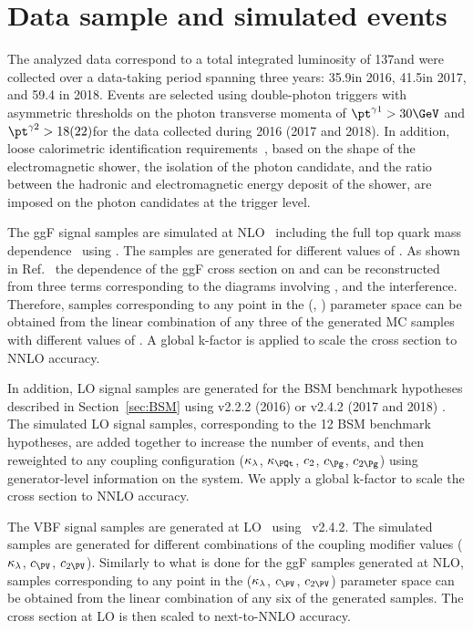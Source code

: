 \documentclass[11pt,twoside,a4paper,cmspaper,final,collab]{cms-tdr}
\begin{document}
\section{Data sample and simulated events} \label{sec:samples}
The analyzed data correspond to a total integrated luminosity of 137\fbinv and were collected over a data-taking period spanning three years: 35.9\fbinv in 2016, 41.5\fbinv in 2017, and \mbox{59.4\fbinv} in 2018.
Events are selected using double-photon triggers with asymmetric thresholds on the photon transverse momenta of $\ptgone > 30\GeV$ and $\ptgtwo > 18 (22)$\GeV for the data collected during 2016 (2017 and 2018). In addition, loose calorimetric identification requirements~\cite{Sirunyan:2018ouh}, based on the shape of the electromagnetic shower, the isolation of the photon candidate, and the ratio between the hadronic and electromagnetic energy deposit of the shower, are imposed on the photon candidates at the trigger level. 

The ggF \HH signal samples are simulated at NLO~\cite{Bagnaschi:2011tu,Heinrich:2017kxx,Heinrich:2019bkc,Jones:2017giv} including
the full top quark mass dependence~\cite{Buchalla:2018yce} using . 
The samples are generated for different values of \kapl. As shown in Ref.~\cite{Heinrich:2019bkc} the dependence of the ggF \HH cross section on \kapl and \kapt can be reconstructed from three terms corresponding to the diagrams involving \kapl, \kapt and the interference. Therefore, samples corresponding to any point in the (\kapl, \kapt) parameter space can be obtained from the linear combination of any three of the generated MC samples with different values of \kapl.
A global k-factor is applied to scale the cross section to NNLO accuracy.

In addition, LO signal samples are generated for the BSM benchmark hypotheses described in Section~\ref{sec:BSM} using \MGvATNLO v2.2.2 (2016) or v2.4.2 (2017 and 2018) \cite{Alwall:2014hca, Hespel:2014sla, Frederix:2014hta}.
The simulated LO signal samples, corresponding to the 12 BSM benchmark hypotheses, are added together to increase the number of events, and then reweighted to any coupling configuration ($\kappa_{\lambda}$, $\kapt$, $c_2$, $\cg$, $\cgg$) using generator-level information on the \HH system. We apply a global k-factor to scale the cross section to NNLO accuracy.

The VBF \HH signal samples are generated at LO~\cite{Alwall:2014hca} using \MGvATNLO~v2.4.2. The simulated samples are generated for different combinations of the coupling modifier values ($\kappa_{\lambda}$, $\conev$, $\ctwov$). Similarly to what is done for the ggF \HH samples generated at NLO, samples corresponding to any point in the ($\kappa_{\lambda}$, $\conev$, $\ctwov$) parameter space can be obtained from the linear combination of any six of the generated samples. The cross section at LO is then scaled to next-to-NNLO accuracy.
\end{document}
